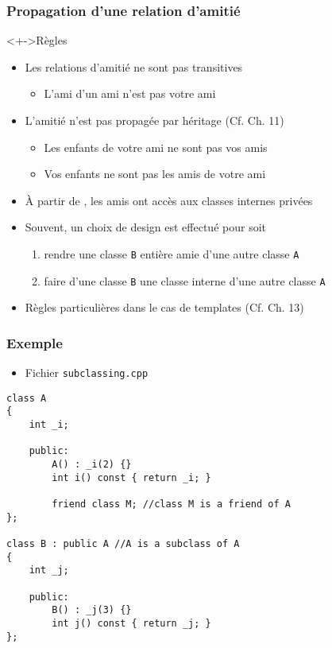 \begin{frame}
\frametitle{Propagation d'une relation d'amitié}
\begin{alertblock}<+->{Règles}
\begin{itemize}[<+->]
\item Les relations d'amitié ne sont pas transitives
	\begin{itemize}
	\item L'ami d'un ami n'est pas votre ami
	\end{itemize}
\item L'amitié n'est pas propagée par héritage (Cf. Ch. 11)
	\begin{itemize}
	\item Les enfants de votre ami ne sont pas vos amis	
	\item Vos enfants ne sont pas les amis de votre ami
	\end{itemize}
\item À partir de , les amis ont accès aux classes internes privées
\end{itemize}
\end{alertblock}
\begin{itemize}[<+->]
\item Souvent, un choix de design est effectué pour soit
	\begin{enumerate}
	\item rendre une classe \texttt{B} entière amie d'une autre classe \texttt{A}
	\item faire d'une classe \texttt{B} une classe interne d'une autre classe \texttt{A}
	\end{enumerate}
\item Règles particulières dans le cas de templates (Cf. Ch. 13)
\end{itemize}
\end{frame}

\begin{frame}[containsverbatim]
\frametitle{Exemple}
\begin{itemize}
\item Fichier \texttt{subclassing.cpp}
\end{itemize}
\begin{lstlisting}
class A
{
	int _i;
	
	public:
		A() : _i(2) {}
		int i() const { return _i; }

		friend class M; //class M is a friend of A
};

class B : public A //A is a subclass of A
{
	int _j;
	
	public:
		B() : _j(3) {}
		int j() const { return _j; }
};
\end{lstlisting}
\end{frame}


